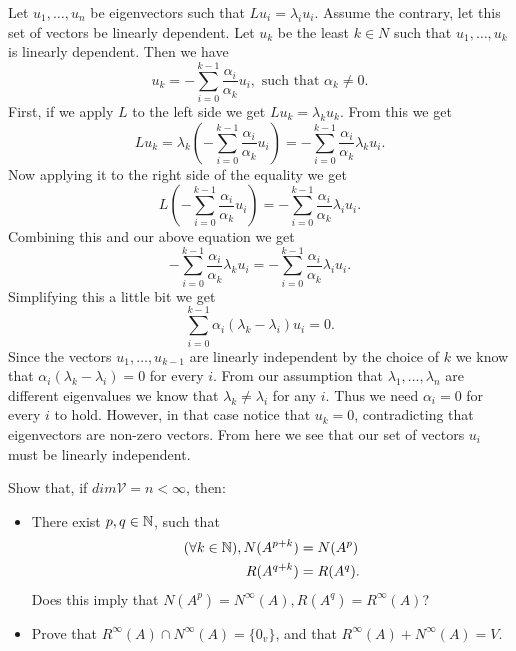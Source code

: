 \documentclass{article}
\begin{document}
\begin{solution}
  Let $u_1, \ldots, u_n$ be eigenvectors such that $Lu_i = \lambda_i u_i$.
  Assume the contrary, let this set of vectors be linearly dependent.
  Let $u_k$ be the least $k \in N$ such that $u_1, \ldots, u_k$ is linearly dependent.
  Then we have
  \[u_k = - \sum_{i = 0}^{k - 1} \frac{\alpha_i}{\alpha_k} u_i, \text{ such that $\alpha_k \neq 0$.}\]
  First, if we apply $L$ to the left side we get $Lu_k = \lambda_k u_k$.
  From this we get
  \[Lu_k = \lambda_k (- \sum_{i = 0}^{k - 1} \frac{\alpha_i}{\alpha_k} u_i) = - \sum_{i = 0}^{k - 1} \frac{\alpha_i}{\alpha_k} \lambda_k u_i.\]
  Now applying it to the right side of the equality we get
  \[L(- \sum_{i = 0}^{k - 1} \frac{\alpha_i}{\alpha_k} u_i) = - \sum_{i = 0}^{k - 1} \frac{\alpha_i}{\alpha_k} \lambda_i u_i.\]
  Combining this and our above equation we get
  \[- \sum_{i = 0}^{k - 1} \frac{\alpha_i}{\alpha_k} \lambda_k u_i = - \sum_{i = 0}^{k - 1} \frac{\alpha_i}{\alpha_k} \lambda_i u_i.\]
  Simplifying this a little bit we get
  \[\sum_{i = 0}^{k - 1} \alpha_i (\lambda_k - \lambda_i) u_i = 0.\]
  Since the vectors $u_1, \ldots, u_{k - 1}$ are linearly independent by the choice of $k$ we know that $\alpha_i (\lambda_k - \lambda_i) = 0$ for every $i$.
  From our assumption that $\lambda_1, \ldots, \lambda_n$ are different eigenvalues we know that $\lambda_k \neq \lambda_i$ for any $i$.
  Thus we need $\alpha_i = 0$ for every $i$ to hold.
  However, in that case notice that $u_k = 0$, contradicting that eigenvectors are non-zero vectors.
  From here we see that our set of vectors $u_i$ must be linearly independent.
\end{solution}

\begin{problem}
  Show that, if $dim \mathcal{V} = n < \infty$, then:
  \begin{itemize}
    \item There exist $p, q \in \mathbb{N}$, such that
      \[\begin{aligned}
        (\forall k \in \mathbb{N}), N(A^{p + k}) &= N(A^p)\\
        R(A^{q + k}) &= R(A^q).
      \end{aligned}\]
      Does this imply that $N(A^p) = N^{\infty}(A), R(A^q) = R^{\infty}(A)$?
    \item Prove that $R^{\infty}(A) \cap N^{\infty}(A) = \{0_v\}$, and that $R^{\infty}(A) + N^{\infty}(A) = V$.
  \end{itemize}
\end{problem}
\end{document}
